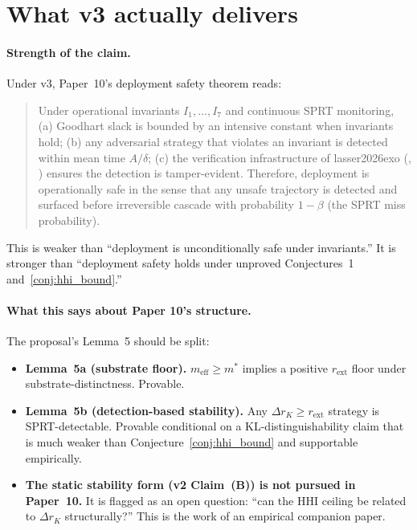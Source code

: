 \documentclass{article}
\makeatletter
\newcommand{\citep}[2][]{%
  \begingroup
  \def\@tmpkey{#2}%
  \ifx\@tmpkey\@empty\else
    (\ifx\@empty#1\@empty\else #1, \fi
     \@nameuse{bibkey@\@tmpkey})%
  \fi
  \endgroup
}
\newcommand{\rext}{r_{\mathrm{ext}}}
\newcommand{\meff}{m_{\mathrm{eff}}}
\makeatother
\begin{document}
\section{What v3 actually delivers}

\paragraph{Strength of the claim.}
Under v3, Paper~10's deployment safety theorem reads:

\begin{quote}
Under operational invariants $I_1, \ldots, I_7$ and continuous SPRT
monitoring, (a) Goodhart slack is bounded by an intensive constant
when invariants hold; (b) any adversarial strategy that violates an
invariant is detected within mean time $A/\delta$; (c) the verification
infrastructure of \citep{lasser2026exo} ensures the detection is
tamper-evident.  Therefore, deployment is operationally safe in the
sense that any unsafe trajectory is detected and surfaced before
irreversible cascade with probability $1 - \beta$ (the SPRT miss
probability).
\end{quote}

This is weaker than ``deployment is unconditionally safe under
invariants.''  It is stronger than ``deployment safety holds under
unproved Conjectures~1 and~\ref{conj:hhi_bound}.''

\paragraph{What this says about Paper 10's structure.}
The proposal's Lemma~5 should be split:
\begin{itemize}
\item \textbf{Lemma~5a (substrate floor).}  $\meff \geq m^*$ implies a
  positive $\rext$ floor under substrate-distinctness.  Provable.
\item \textbf{Lemma~5b (detection-based stability).}  Any $\Delta r_K
  \geq \rext$ strategy is SPRT-detectable.  Provable conditional on a
  KL-distinguishability claim that is much weaker than
  Conjecture~\ref{conj:hhi_bound} and supportable empirically.
\item \textbf{The static stability form (v2 Claim~(B)) is not pursued
  in Paper~10.}  It is flagged as an open question: ``can the HHI
  ceiling be related to $\Delta r_K$ structurally?''  This is the work
  of an empirical companion paper.
\end{itemize}
\end{document}
